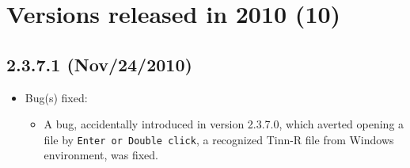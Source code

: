 
\hypertarget{2010}{}
\section{Versions released in 2010 (10)}
\subsection*{2.3.7.1 (Nov/24/2010)}
\begin{itemize}
  \item Bug(s) fixed:
    \begin{itemize}
      \item A bug, accidentally introduced in version 2.3.7.0, which averted opening a file by \texttt{Enter or Double click},
        a recognized Tinn-R file from Windows environment, was fixed.
    \end{itemize}
\end{itemize}


